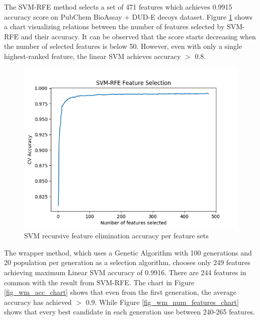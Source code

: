 \documentclass[conference]{IEEEtran}
\begin{document}
The SVM-RFE method selects a set of 471 features which achieves 0.9915 accuracy score on PubChem BioAssay + DUD-E decoys dataset. Figure \ref{fig_svmrfe_acc_num_features_chart} shows a chart visualizing relations between the number of features selected by SVM-RFE and their accuracy. It can be observed that the score starts decreasing when the number of selected features is below 50. However, even with only a single highest-ranked feature, the linear SVM achieves accuracy $>$ 0.8.

\begin{figure}
	\includegraphics[scale=0.5]{../images/SVM_RFE_chart.png}
	\caption{SVM recursive feature elimination accuracy per feature sets}
	\label{fig_svmrfe_acc_num_features_chart}
\end{figure}

The wrapper method, which uses a Genetic Algorithm with 100 generations and 20 population per generation as a selection algorithm, chooses only 249 features achieving maximum Linear SVM accuracy of 0.9916. There are 244 features in common with the result from SVM-RFE. The chart in Figure \ref{fig_wm_acc_chart} shows that even from the first generation, the average accuracy has achieved $>$ 0.9. While Figure \ref{fig_wm_num_features_chart} shows that every best candidate in each generation use between 240-265 features.
\end{document}
